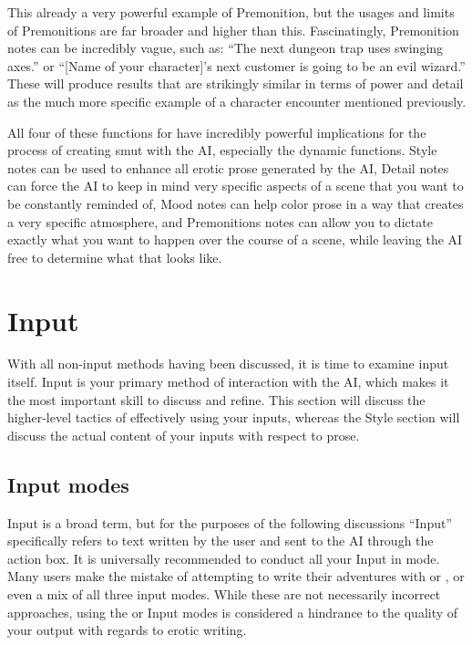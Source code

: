 \documentclass[Source-main.tex]{subfiles}
\begin{document}
This already a very powerful example of Premonition, but the usages and limits of Premonitions are far broader and higher than this.
Fascinatingly, Premonition notes can be incredibly vague, such as: “The next dungeon trap uses swinging axes.” or “[Name of your character]’s next customer is going to be an evil wizard.” These will produce results that are strikingly similar in terms of power and detail as the much more specific example of a character encounter mentioned previously.

All four of these functions for \an have incredibly powerful implications for the process of creating smut with the AI, especially the dynamic functions.
Style notes can be used to enhance all erotic prose generated by the AI, Detail notes can force the AI to keep in mind very specific aspects of a scene that you want to be constantly reminded of, Mood notes can help color prose in a way that creates a very specific atmosphere, and Premonitions notes can allow you to dictate exactly what you want to happen over the course of a scene, while leaving the AI free to determine what that looks like.

\chapter{Input}
\label{ch:input}

With all non-input methods having been discussed, it is time to examine input itself.
Input is your primary method of interaction with the AI, which makes it the most important skill to discuss and refine.
This section will discuss the higher-level tactics of effectively using your inputs, whereas the Style section will discuss the actual content of your inputs with respect to prose.

\section{Input modes}
\label{sec:inputmodes}

Input is a broad term, but for the purposes of the following discussions “Input” specifically refers to text written by the user and sent to the AI through the action box.
It is universally recommended to conduct all your Input in \story mode.
Many users make the mistake of attempting to write their adventures with \Do or \say, or even a mix of all three input modes.
While these are not necessarily incorrect approaches, using the \Do or \say Input modes is considered a hindrance to the quality of your output with regards to erotic writing.
\end{document}
